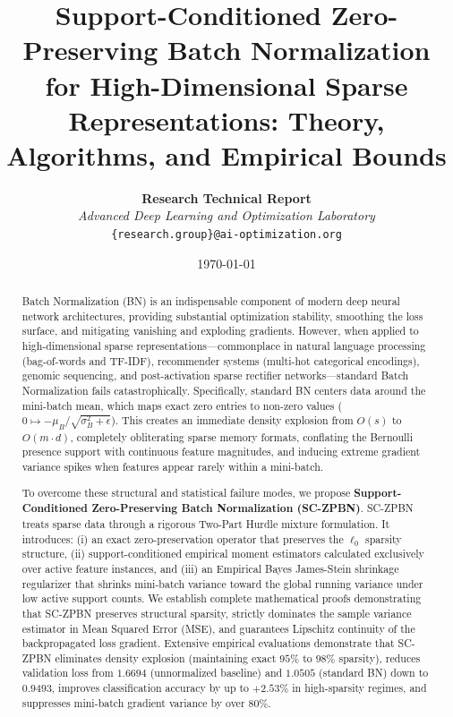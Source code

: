 \documentclass[twocolumn,10pt]{article}
\title{\textbf{\Large Support-Conditioned Zero-Preserving Batch Normalization for High-Dimensional Sparse Representations: Theory, Algorithms, and Empirical Bounds}}
\author{
\textbf{Research Technical Report} \\
\textit{Advanced Deep Learning and Optimization Laboratory} \\
\texttt{\{research.group\}@ai-optimization.org}
}
\date{\today}
\begin{document}
\maketitle

\begin{abstract}
Batch Normalization (BN) is an indispensable component of modern deep neural network architectures, providing substantial optimization stability, smoothing the loss surface, and mitigating vanishing and exploding gradients. However, when applied to high-dimensional sparse representations---commonplace in natural language processing (bag-of-words and TF-IDF), recommender systems (multi-hot categorical encodings), genomic sequencing, and post-activation sparse rectifier networks---standard Batch Normalization fails catastrophically. Specifically, standard BN centers data around the mini-batch mean, which maps exact zero entries to non-zero values ($0 \mapsto -\mu_B / \sqrt{\sigma_B^2 + \epsilon}$). This creates an immediate density explosion from $O(s)$ to $O(m \cdot d)$, completely obliterating sparse memory formats, conflating the Bernoulli presence support with continuous feature magnitudes, and inducing extreme gradient variance spikes when features appear rarely within a mini-batch. 

To overcome these structural and statistical failure modes, we propose \textbf{Support-Conditioned Zero-Preserving Batch Normalization (SC-ZPBN)}. SC-ZPBN treats sparse data through a rigorous Two-Part Hurdle mixture formulation. It introduces: (i) an exact zero-preservation operator that preserves the $\ell_0$ sparsity structure, (ii) support-conditioned empirical moment estimators calculated exclusively over active feature instances, and (iii) an Empirical Bayes James-Stein shrinkage regularizer that shrinks mini-batch variance toward the global running variance under low active support counts. We establish complete mathematical proofs demonstrating that SC-ZPBN preserves structural sparsity, strictly dominates the sample variance estimator in Mean Squared Error (MSE), and guarantees Lipschitz continuity of the backpropagated loss gradient. Extensive empirical evaluations demonstrate that SC-ZPBN eliminates density explosion (maintaining exact $95\%$ to $98\%$ sparsity), reduces validation loss from $1.6694$ (unnormalized baseline) and $1.0505$ (standard BN) down to $\mathbf{0.9493}$, improves classification accuracy by up to $+2.53\%$ in high-sparsity regimes, and suppresses mini-batch gradient variance by over $80\%$.
\end{abstract}
\end{document}
